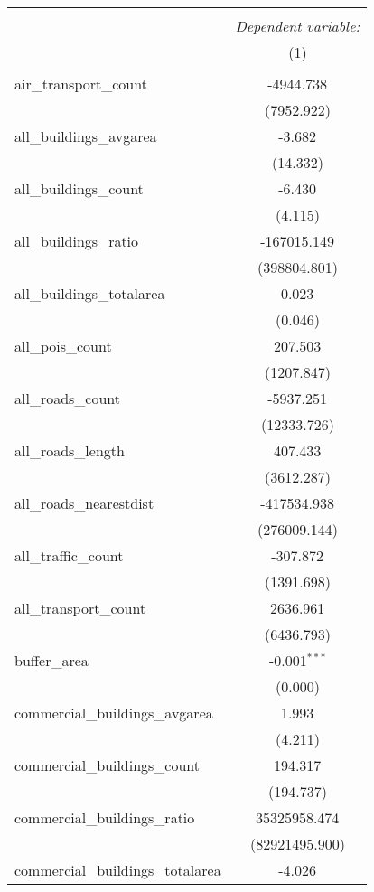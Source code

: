 \begin{table}[!htbp] \centering
\begin{tabular}{@{\extracolsep{5pt}}lc}
\\[-1.8ex]\hline
\hline \\[-1.8ex]
& \multicolumn{1}{c}{\textit{Dependent variable:}} \
\cr \cline{1-2}
\\[-1.8ex] & (1) \\
\hline \\[-1.8ex]
 air_transport_count & -4944.738$^{}$ \\
  & (7952.922) \\
 all_buildings_avgarea & -3.682$^{}$ \\
  & (14.332) \\
 all_buildings_count & -6.430$^{}$ \\
  & (4.115) \\
 all_buildings_ratio & -167015.149$^{}$ \\
  & (398804.801) \\
 all_buildings_totalarea & 0.023$^{}$ \\
  & (0.046) \\
 all_pois_count & 207.503$^{}$ \\
  & (1207.847) \\
 all_roads_count & -5937.251$^{}$ \\
  & (12333.726) \\
 all_roads_length & 407.433$^{}$ \\
  & (3612.287) \\
 all_roads_nearestdist & -417534.938$^{}$ \\
  & (276009.144) \\
 all_traffic_count & -307.872$^{}$ \\
  & (1391.698) \\
 all_transport_count & 2636.961$^{}$ \\
  & (6436.793) \\
 buffer_area & -0.001$^{***}$ \\
  & (0.000) \\
 commercial_buildings_avgarea & 1.993$^{}$ \\
  & (4.211) \\
 commercial_buildings_count & 194.317$^{}$ \\
  & (194.737) \\
 commercial_buildings_ratio & 35325958.474$^{}$ \\
  & (82921495.900) \\
 commercial_buildings_totalarea & -4.026$^{}$ \\

\end{tabular}
\end{table}

